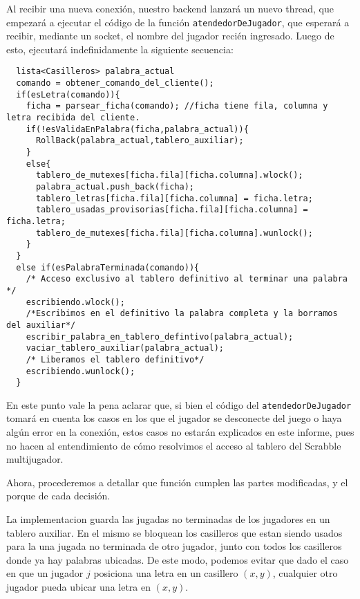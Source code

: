 Al recibir una nueva conexi\'on, nuestro backend lanzar\'a un nuevo thread, que empezar\'a a ejecutar el c\'odigo de la funci\'on \verb|atendedorDeJugador|, 
que esperar\'a a recibir, mediante un socket, el nombre del jugador reci\'en ingresado. Luego de esto, ejecutar\'a indefinidamente la siguiente secuencia:

\begin{verbatim}
  lista<Casilleros> palabra_actual
  comando = obtener_comando_del_cliente();
  if(esLetra(comando)){
    ficha = parsear_ficha(comando);	//ficha tiene fila, columna y letra recibida del cliente.
    if(!esValidaEnPalabra(ficha,palabra_actual)){
      RollBack(palabra_actual,tablero_auxiliar);
    }
    else{
      tablero_de_mutexes[ficha.fila][ficha.columna].wlock();
      palabra_actual.push_back(ficha);
      tablero_letras[ficha.fila][ficha.columna] = ficha.letra;
      tablero_usadas_provisorias[ficha.fila][ficha.columna] = ficha.letra;
      tablero_de_mutexes[ficha.fila][ficha.columna].wunlock();
    }
  }
  else if(esPalabraTerminada(comando)){
    /* Acceso exclusivo al tablero definitivo al terminar una palabra */
    escribiendo.wlock();
    /*Escribimos en el definitivo la palabra completa y la borramos del auxiliar*/
    escribir_palabra_en_tablero_defintivo(palabra_actual);
    vaciar_tablero_auxiliar(palabra_actual);
    /* Liberamos el tablero definitivo*/
    escribiendo.wunlock(); 
  }
\end{verbatim}

En este punto vale la pena aclarar que, si bien el c\'odigo del \verb|atendedorDeJugador| tomar\'a en cuenta los casos en los que 
el jugador se desconecte
del juego o haya alg\'un error en la conexi\'on, estos casos no estar\'an explicados en este informe, pues no hacen al entendimiento 
de c\'omo resolvimos
el acceso al tablero del Scrabble multijugador.

Ahora, procederemos a detallar que funci\'on cumplen las partes modificadas, y el porque de cada decisi\'on.

La implementacion guarda las jugadas no terminadas de los jugadores en un tablero auxiliar. En el mismo se bloquean los casilleros que estan siendo
usados para la una jugada no terminada de otro jugador, junto con todos los casilleros donde ya hay palabras ubicadas. De este modo, podemos
evitar que dado el caso en que un jugador $j$ posiciona una letra en un casillero $(x,y)$, cualquier otro jugador pueda ubicar una letra en $(x,y)$.

